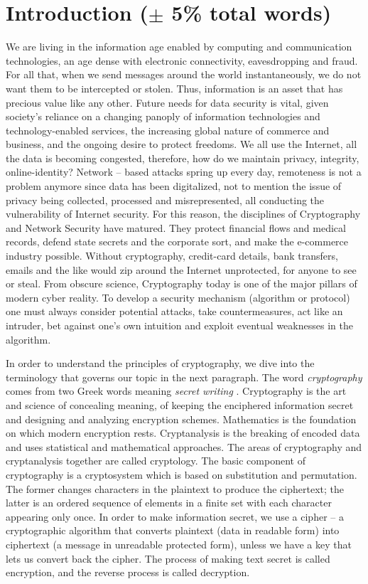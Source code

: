 \section{Introduction ($\pm$ 5\% total words)}
We are living in the information age enabled by computing and communication technologies, an age dense with electronic connectivity, eavesdropping and fraud. For all that, when we send messages around the world instantaneously, we do not want them to be intercepted or stolen. Thus, information is an asset that has precious value like any other. Future needs for data security is vital, given society's reliance on a changing panoply of information technologies and technology-enabled services, the increasing global nature of commerce and business, and the ongoing desire to protect freedoms. We all use the Internet, all the data is becoming congested, therefore, how do we maintain privacy, integrity, online-identity? Network – based attacks spring up every day, remoteness is not a problem anymore since data has been digitalized, not to mention the issue of privacy being collected, processed and misrepresented, all conducting the vulnerability of Internet security. For this reason, the disciplines of Cryptography and Network Security have matured. They protect financial flows and medical records, defend state secrets and the corporate sort, and make the e-commerce industry possible. Without cryptography, credit-card details, bank transfers, emails and the like would zip around the Internet unprotected, for anyone to see or steal. From obscure science, Cryptography today is one of the major pillars of modern cyber reality. To develop a security mechanism (algorithm or protocol) one must always consider potential attacks, take countermeasures, act like an intruder, bet against one’s own intuition and exploit eventual weaknesses in the algorithm. 

In order to understand the principles of cryptography, we dive into the terminology that governs our topic in the next paragraph. The word \emph{cryptography} comes from two Greek words meaning \emph{secret writing} \cite{wikicrypto}. Cryptography is the art and science of concealing meaning, of keeping the enciphered information secret and designing and analyzing encryption schemes. Mathematics is the foundation on which modern encryption rests. Cryptanalysis is the breaking of encoded data and uses statistical and mathematical approaches. The areas of cryptography and cryptanalysis together are called cryptology. The basic component of cryptography is a cryptosystem which is based on substitution and permutation. The former changes characters in the plaintext to produce the ciphertext; the latter is an ordered sequence of elements in a finite set with each character appearing only once. In order to make information secret, we use a cipher – a cryptographic algorithm that converts plaintext (data in readable form) into ciphertext (a message in unreadable protected form), unless we have a key that lets us convert back the cipher. The process of making text secret is called encryption, and the reverse process is called decryption.

